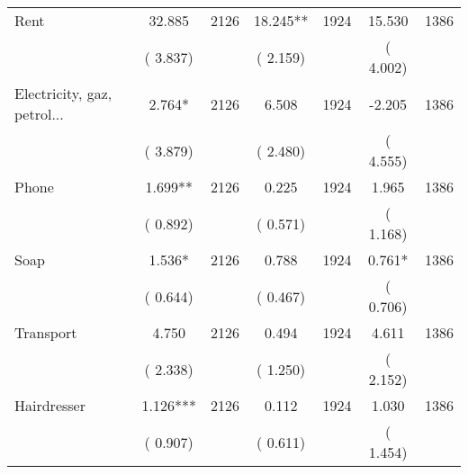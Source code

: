 \begin{tabular}{l*{6}{c}}
Rent        &             32.885      &       2126       &             18.245**      &       1924       &             15.530      &       1386       \\
                       &       (       3.837)            &                               &       (       2.159)            &                               &       (       4.002)            &                               \\
Electricity, gaz, petrol...        &              2.764*      &       2126       &              6.508      &       1924       &             -2.205      &       1386       \\
                       &       (       3.879)            &                               &       (       2.480)            &                               &       (       4.555)            &                               \\
Phone        &              1.699**      &       2126       &              0.225      &       1924       &              1.965      &       1386       \\
                       &       (       0.892)            &                               &       (       0.571)            &                               &       (       1.168)            &                               \\
Soap        &              1.536*      &       2126       &              0.788      &       1924       &              0.761*      &       1386       \\
                       &       (       0.644)            &                               &       (       0.467)            &                               &       (       0.706)            &                               \\
Transport        &              4.750      &       2126       &              0.494      &       1924       &              4.611      &       1386       \\
                       &       (       2.338)            &                               &       (       1.250)            &                               &       (       2.152)            &                               \\
Hairdresser        &              1.126***      &       2126       &              0.112      &       1924       &              1.030      &       1386       \\
                       &       (       0.907)            &                               &       (       0.611)            &                               &       (       1.454)            &                               \\

\end{tabular}
